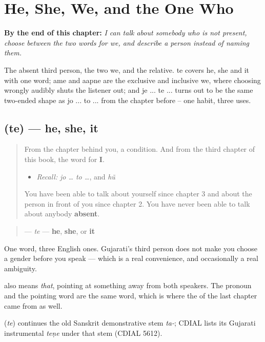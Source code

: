 
\chapter{He, She, We, and the One Who}
\label{ch:gu-pronouns-and-relative}

\begin{chapteropening}
\textbf{By the end of this chapter:} \emph{I can talk about somebody who is not present, choose between the two words for we, and describe a person instead of naming them.}

The absent third person, the two we, and the relative. te covers he, she and it with one word; ame and aapne are the exclusive and inclusive we, where choosing wrongly audibly shuts the listener out; and je ... te ... turns out to be the same two-ended shape as jo ... to ... from the chapter before -- one habit, three uses.
\end{chapteropening}

\section[\texorpdfstring{\gu{તે} (te)}{તે (te)}]{ (te) — he, she, it}

\label{lesson:GU-C36-te}



\begin{quote}
From the chapter behind you, a condition. And from the third chapter of this book, the word for \textbf{I}.

\begin{itemize}
\raggedright
  \item \emph{Recall:} \emph{jo … to …}, and \emph{hũ}
\end{itemize}

You have been able to talk about yourself since chapter 3 and about the person in front of you since chapter 2. You have never been able to talk about anybody \textbf{absent}.
\end{quote}

\begin{cousinweb}
\begin{quote}
\textbf{} — \emph{te} — \textbf{he}, \textbf{she}, or \textbf{it}
\end{quote}

One word, three English ones. Gujarati's third person does not make you choose a gender before you speak — which is a real convenience, and occasionally a real ambiguity.

\textbf{} also means \emph{that}, pointing at something away from both speakers. The pronoun and the pointing word are the same word, which is where the \textbf{} of the last chapter came from as well.

\textbf{} (\emph{te}) continues the old Sanskrit demonstrative stem \emph{ta-}; CDIAL lists its Gujarati instrumental \emph{teṇe} under that stem (CDIAL 5612).
\end{cousinweb}

